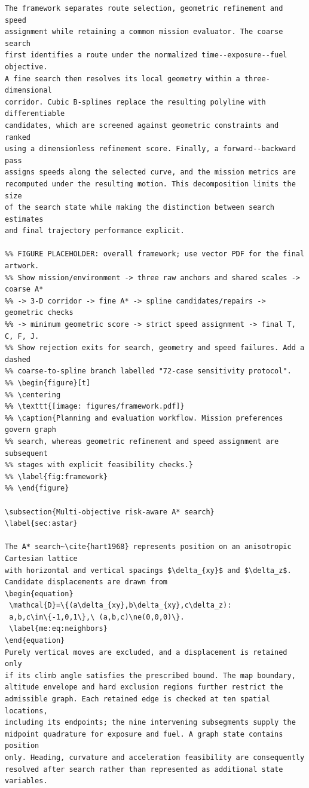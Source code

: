\documentclass[12pt]{article}
\begin{document}
\begin{verbatim}
The framework separates route selection, geometric refinement and speed
assignment while retaining a common mission evaluator. The coarse search
first identifies a route under the normalized time--exposure--fuel objective.
A fine search then resolves its local geometry within a three-dimensional
corridor. Cubic B-splines replace the resulting polyline with differentiable
candidates, which are screened against geometric constraints and ranked
using a dimensionless refinement score. Finally, a forward--backward pass
assigns speeds along the selected curve, and the mission metrics are
recomputed under the resulting motion. This decomposition limits the size
of the search state while making the distinction between search estimates
and final trajectory performance explicit.

%% FIGURE PLACEHOLDER: overall framework; use vector PDF for the final artwork.
%% Show mission/environment -> three raw anchors and shared scales -> coarse A*
%% -> 3-D corridor -> fine A* -> spline candidates/repairs -> geometric checks
%% -> minimum geometric score -> strict speed assignment -> final T, C, F, J.
%% Show rejection exits for search, geometry and speed failures. Add a dashed
%% coarse-to-spline branch labelled "72-case sensitivity protocol".
%% \begin{figure}[t]
%% \centering
%% \texttt{[image: figures/framework.pdf]}
%% \caption{Planning and evaluation workflow. Mission preferences govern graph
%% search, whereas geometric refinement and speed assignment are subsequent
%% stages with explicit feasibility checks.}
%% \label{fig:framework}
%% \end{figure}

\subsection{Multi-objective risk-aware A* search}
\label{sec:astar}

The A* search~\cite{hart1968} represents position on an anisotropic Cartesian lattice
with horizontal and vertical spacings $\delta_{xy}$ and $\delta_z$.
Candidate displacements are drawn from
\begin{equation}
 \mathcal{D}=\{(a\delta_{xy},b\delta_{xy},c\delta_z):
 a,b,c\in\{-1,0,1\},\ (a,b,c)\ne(0,0,0)\}.
 \label{me:eq:neighbors}
\end{equation}
Purely vertical moves are excluded, and a displacement is retained only
if its climb angle satisfies the prescribed bound. The map boundary,
altitude envelope and hard exclusion regions further restrict the
admissible graph. Each retained edge is checked at ten spatial locations,
including its endpoints; the nine intervening subsegments supply the
midpoint quadrature for exposure and fuel. A graph state contains position
only. Heading, curvature and acceleration feasibility are consequently
resolved after search rather than represented as additional state variables.


\end{verbatim}
\end{document}
